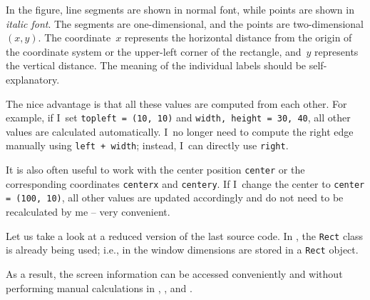 %
%
%
%
%
%
%
%
%
%
%
%

%
%
%
%
%
%
%
%
%
%
%
%

In the figure, line segments are shown in normal font, while points are shown in \textit{italic font}. The segments are one-dimensional, and the points are two-dimensional $(x, y)$. The coordinate~$x$ represents the horizontal distance from the origin of the coordinate system or the upper-left corner of the rectangle, and~$y$ represents the vertical distance. The meaning of the individual labels should be self-explanatory.

The nice advantage is that all these values are computed from each other. For example, if I~set \texttt{topleft = (10, 10)} and \texttt{width, height = 30, 40}, all other values are calculated automatically. I~no longer need to compute the right edge manually using \texttt{left + width}; instead, I~can directly use \texttt{right}.

It is also often useful to work with the center position \texttt{center} or the corresponding coordinates \texttt{centerx} and \texttt{centery}. If I~change the center to \texttt{center = (100, 10)}, all other values are updated accordingly and do not need to be recalculated by me -- very convenient.

Let us take a look at a reduced version of the last source code. In , the \texttt{Rect} class is already being used; i.e., in  the window dimensions are stored in a \texttt{Rect} object. 


As a result, the screen information can be accessed conveniently and without performing manual calculations in , , and .

